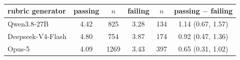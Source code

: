 \begin{table}[h]
\centering
\small
\begin{tabular}{lccccc}
\toprule
rubric generator & passing & $n$ & failing & $n$ & passing $-$ failing \\
\midrule
Qwen3.8-27B & 4.42 & 825 & 3.28 & 134 & 1.14 (0.67, 1.57) \\
Deepseek-V4-Flash & 4.80 & 754 & 3.87 & 174 & 0.92 (0.47, 1.36) \\
Opus-5 & 4.09 & 1269 & 3.43 & 397 & 0.65 (0.31, 1.02) \\
\bottomrule
\end{tabular}
\caption{}
\label{tab:matching_pass_fail}
\end{table}

